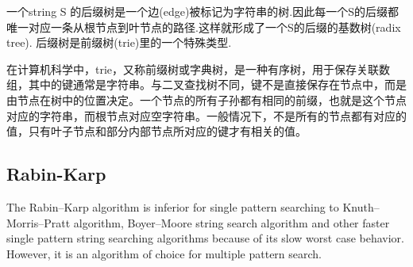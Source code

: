 一个string S 的后缀树是一个边(edge)被标记为字符串的树.因此每一个S的后缀都唯一对应一条从根节点到叶节点的路径.这样就形成了一个S的后缀的基数树(radix tree). 后缀树是前缀树(trie)里的一个特殊类型.

在计算机科学中，trie，又称前缀树或字典树，是一种有序树，用于保存关联数组，其中的键通常是字符串。与二叉查找树不同，键不是直接保存在节点中，而是由节点在树中的位置决定。一个节点的所有子孙都有相同的前缀，也就是这个节点对应的字符串，而根节点对应空字符串。一般情况下，不是所有的节点都有对应的值，只有叶子节点和部分内部节点所对应的键才有相关的值。




\subsection{Rabin-Karp}

The Rabin–Karp algorithm is inferior for single pattern searching to Knuth–Morris–Pratt algorithm, Boyer–Moore string search algorithm and other faster single pattern string searching algorithms because of its slow worst case behavior. However, it is an algorithm of choice for multiple pattern search.




















